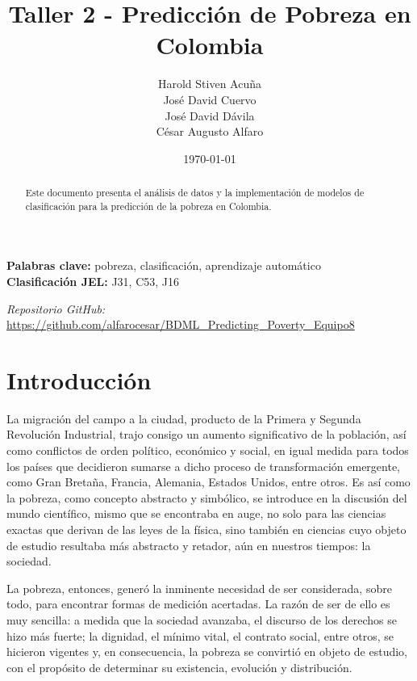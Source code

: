 \documentclass[12pt,a4paper,onecolumn]{article}
\title{\textbf{Taller 2 - Predicción de Pobreza en Colombia}}
\author{%
\begin{center}
Harold Stiven Acuña\\
José David Cuervo\\
José David Dávila\\
César Augusto Alfaro
\end{center}%
}
\date{\today}
\begin{document}
\maketitle
\thispagestyle{empty}


\begin{abstract}
Este documento presenta el análisis de datos y la implementación de modelos de clasificación para la predicción de la pobreza en Colombia.
\end{abstract}

\medskip

\begin{flushleft}
    {\bf Palabras clave:} pobreza, clasificación, aprendizaje automático \\
    {\bf Clasificación JEL:} J31, C53, J16
\end{flushleft}

\begin{center}
    \textit{Repositorio GitHub:} \url{https://github.com/alfarocesar/BDML_Predicting_Poverty_Equipo8}
\end{center}

\pagebreak
\singlespacing
\setlength{\parindent}{0pt}
\setlength{\parskip}{1em}


\section{Introducción}

La migración del campo a la ciudad, producto de la Primera y Segunda Revolución Industrial, trajo consigo un aumento significativo de la población, así como conflictos de orden político, económico y social, en igual medida para todos los países que decidieron sumarse a dicho proceso de transformación emergente, como Gran Bretaña, Francia, Alemania, Estados Unidos, entre otros. Es así como la pobreza, como concepto abstracto y simbólico, se introduce en la discusión del mundo científico, mismo que se encontraba en auge, no solo para las ciencias exactas que derivan de las leyes de la física, sino también en ciencias cuyo objeto de estudio resultaba más abstracto y retador, aún en nuestros tiempos: la sociedad.

La pobreza, entonces, generó la inminente necesidad de ser considerada, sobre todo, para encontrar formas de medición acertadas. La razón de ser de ello es muy sencilla: a medida que la sociedad avanzaba, el discurso de los derechos se hizo más fuerte; la dignidad, el mínimo vital, el contrato social, entre otros, se hicieron vigentes y, en consecuencia, la pobreza se convirtió en objeto de estudio, con el propósito de determinar su existencia, evolución y distribución.
\end{document}
